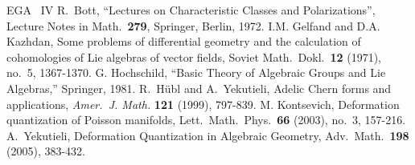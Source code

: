 \documentclass[10pt]{amsart}
\theoremstyle{definition}
\numberwithin{equation}{section}
\begin{document}
\begin{thebibliography}{EGA ~IV}
 R.\ Bott, ``Lectures on Characteristic Classes
        and Polarizations'', Lecture Notes in Math.\ {\bf 279},
        Springer, Berlin, 1972. 
 I.M. Gelfand and D.A. Kazhdan, 
    Some problems of differential geometry and the calculation of 
    cohomologies of Lie algebras of vector fields, 
    Soviet Math.\ Dokl.\ \textbf{12} (1971), no.\ 5, 1367-1370. 
 G. Hochschild, 
    ``Basic Theory of Algebraic Groups and Lie Algebras,''
    Springer, 1981.
 R.\ H\"{u}bl and A.\ Yekutieli,
    Adelic Chern forms and applications,  {\em Amer.\ J. Math.}
    \textbf{121} (1999), 797-839.
 M. Kontsevich,
    Deformation quantization of Poisson manifolds,
    Lett.\ Math.\ Phys.\ {\bf 66} (2003), no.\ 3, 157-216.
 A.\ Yekutieli,     
    Deformation Quantization in Algebraic Geometry,
    Adv.\ Math.\ {\bf 198} (2005), 383-432.
\end{thebibliography}
\end{document}
